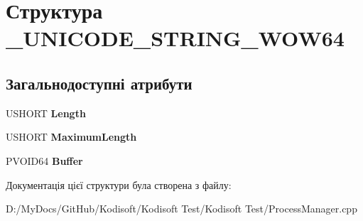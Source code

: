 \hypertarget{struct___u_n_i_c_o_d_e___s_t_r_i_n_g___w_o_w64}{\section{Структура \+\_\+\+U\+N\+I\+C\+O\+D\+E\+\_\+\+S\+T\+R\+I\+N\+G\+\_\+\+W\+O\+W64}
\label{struct___u_n_i_c_o_d_e___s_t_r_i_n_g___w_o_w64}
}
\subsection*{Загальнодоступні атрибути}
\begin{DoxyCompactItemize}
\item 
\hypertarget{struct___u_n_i_c_o_d_e___s_t_r_i_n_g___w_o_w64_a2e067b5bf10223dee38df4b9101b07f9}{U\+S\+H\+O\+R\+T {\bfseries Length}}\label{struct___u_n_i_c_o_d_e___s_t_r_i_n_g___w_o_w64_a2e067b5bf10223dee38df4b9101b07f9}

\item 
\hypertarget{struct___u_n_i_c_o_d_e___s_t_r_i_n_g___w_o_w64_a1849eeba3648f70e29b239fa9fe2ecfb}{U\+S\+H\+O\+R\+T {\bfseries Maximum\+Length}}\label{struct___u_n_i_c_o_d_e___s_t_r_i_n_g___w_o_w64_a1849eeba3648f70e29b239fa9fe2ecfb}

\item 
\hypertarget{struct___u_n_i_c_o_d_e___s_t_r_i_n_g___w_o_w64_a0ba9d9a1e2e45f02879da6b545fa0798}{P\+V\+O\+I\+D64 {\bfseries Buffer}}\label{struct___u_n_i_c_o_d_e___s_t_r_i_n_g___w_o_w64_a0ba9d9a1e2e45f02879da6b545fa0798}

\end{DoxyCompactItemize}


Документація цієї структури була створена з файлу\+:\begin{DoxyCompactItemize}
\item 
D\+:/\+My\+Docs/\+Git\+Hub/\+Kodisoft/\+Kodisoft Test/\+Kodisoft Test/Process\+Manager.\+cpp\end{DoxyCompactItemize}

